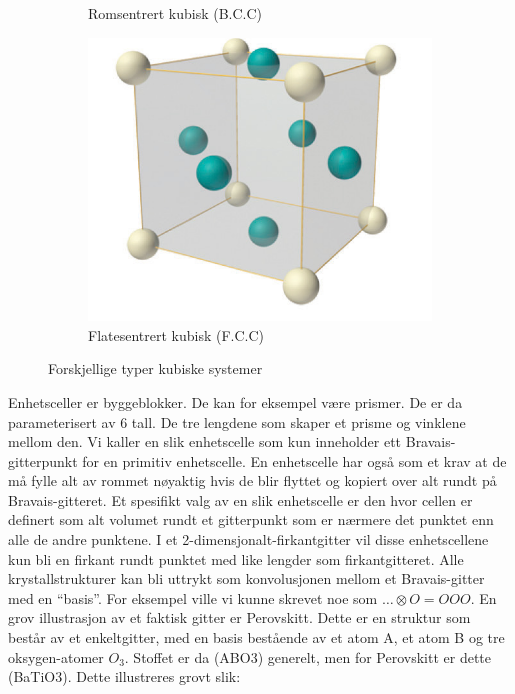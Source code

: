 \documentclass{article}
\begin{document}
\begin{figure}[H]
\begin{subfigure}{0.3\textwidth}
    \caption{Romsentrert kubisk (B.C.C)}
    \label{fig:romsentert_kubisk}
  \end{subfigure}
  \begin{subfigure}{0.3\textwidth}
    \includegraphics[width=\linewidth]{bilder/flatesentrert_kubisk.png}
    \caption{Flatesentrert kubisk (F.C.C)}
    \label{fig:flatesentrert_kubisk}
  \end{subfigure}
  \caption{Forskjellige typer kubiske systemer}
  \label{fig:kubiske_interpolasjoner}
\end{figure}
Enhetsceller er byggeblokker. De kan for eksempel være prismer. De er da parameterisert av 6 tall. De tre lengdene som skaper et prisme og vinklene mellom den. Vi kaller en slik enhetscelle som kun inneholder ett Bravais-gitterpunkt for en primitiv enhetscelle. En enhetscelle har også som et krav at de må fylle alt av rommet nøyaktig hvis de blir flyttet og kopiert over alt rundt på Bravais-gitteret.
Et spesifikt valg av en slik enhetscelle er den hvor cellen er definert som alt volumet rundt et gitterpunkt som er nærmere det punktet enn alle de andre punktene. I et 2-dimensjonalt-firkantgitter vil disse enhetscellene kun bli en firkant rundt punktet med like lengder som firkantgitteret.
Alle krystallstrukturer kan bli uttrykt som konvolusjonen mellom et Bravais-gitter med en \enquote{basis}. For eksempel ville vi kunne skrevet noe som $\dots \otimes O = O O O$. En grov illustrasjon av et faktisk gitter er Perovskitt. Dette er en struktur som består av et enkeltgitter, med en basis bestående av et atom A, et atom B og tre oksygen-atomer $O_3$. Stoffet er da (ABO3) generelt, men for Perovskitt er dette (BaTiO3). Dette illustreres grovt slik:
\end{document}
